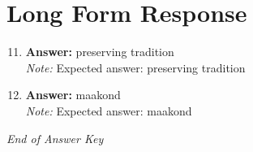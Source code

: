 \documentclass[12pt]{article}
\begin{document}
\section*{Long Form Response}
\begin{enumerate}[label=\arabic*.]
\setcounter{enumi}{10}
\item \textbf{Answer:} preserving tradition
\\ \textit{Note:} Expected answer: preserving tradition
\item \textbf{Answer:} maakond
\\ \textit{Note:} Expected answer: maakond
\end{enumerate}

\vfill
\noindent\textit{End of Answer Key}
\end{document}

